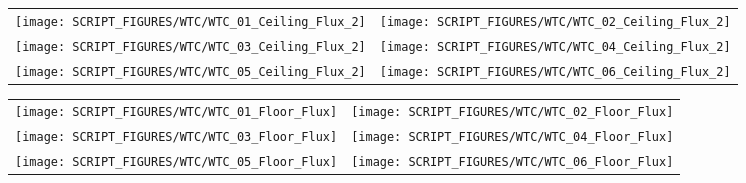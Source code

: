 \begin{figure}[!ht]
\begin{tabular*}{\textwidth}{l@{\extracolsep{\fill}}r}
\texttt{[image: SCRIPT\_FIGURES/WTC/WTC\_01\_Ceiling\_Flux\_2]} &
\texttt{[image: SCRIPT\_FIGURES/WTC/WTC\_02\_Ceiling\_Flux\_2]} \\
\texttt{[image: SCRIPT\_FIGURES/WTC/WTC\_03\_Ceiling\_Flux\_2]} &
\texttt{[image: SCRIPT\_FIGURES/WTC/WTC\_04\_Ceiling\_Flux\_2]} \\
\texttt{[image: SCRIPT\_FIGURES/WTC/WTC\_05\_Ceiling\_Flux\_2]} &
\texttt{[image: SCRIPT\_FIGURES/WTC/WTC\_06\_Ceiling\_Flux\_2]}
\end{tabular*}
\end{figure}

\begin{figure}[!ht]
\begin{tabular*}{\textwidth}{l@{\extracolsep{\fill}}r}
\texttt{[image: SCRIPT\_FIGURES/WTC/WTC\_01\_Floor\_Flux]} &
\texttt{[image: SCRIPT\_FIGURES/WTC/WTC\_02\_Floor\_Flux]} \\
\texttt{[image: SCRIPT\_FIGURES/WTC/WTC\_03\_Floor\_Flux]} &
\texttt{[image: SCRIPT\_FIGURES/WTC/WTC\_04\_Floor\_Flux]} \\
\texttt{[image: SCRIPT\_FIGURES/WTC/WTC\_05\_Floor\_Flux]} &
\texttt{[image: SCRIPT\_FIGURES/WTC/WTC\_06\_Floor\_Flux]}
\end{tabular*}
\end{figure}

\clearpage

